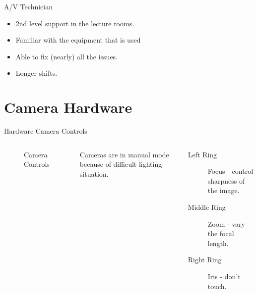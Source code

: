 \documentclass[aspectratio=169]{beamer}
\begin{document}
\begin{frame}{A/V Technician}
	\begin{itemize}
		\item 2nd level support in the lecture rooms. 
		\item Familiar with the equipment that is used 
		\item Able to fix (nearly) all the issues. 
		\item Longer shifts.
	\end{itemize}
\end{frame}

\section{Camera Hardware}
\begin{frame}{Hardware Camera Controls}
	\begin{columns}[T,onlytextwidth]
		\begin{figure} 
			\centering
			\caption{Camera Controls}
		\end{figure}
		Cameras are in manual mode because of difficult lighting situation.
		\begin{description}
			\item[Left Ring] Focus - control sharpness of the image.
			\item[Middle Ring] Zoom - vary the focal length.
			\item[Right Ring] Iris - don't touch.
		\end{description}
	\end{columns}
\end{frame}
\end{document}
